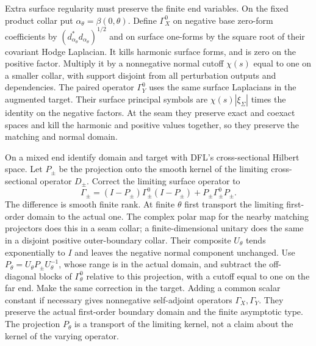 \documentclass[11pt]{amsart}
\theoremstyle{definition}
\theoremstyle{remark}
\theoremstyle{plain}
\begin{document}
Extra surface regularity must preserve the finite end variables.
On the fixed product collar put $\alpha_\theta=\beta(0,\theta)$.
Define $\Gamma_X^0$ on negative base zero-form coefficients by
$(d_{\alpha_\theta}^*d_{\alpha_\theta})^{1/2}$ and on surface
one-forms by the square root of their covariant Hodge Laplacian.
It kills harmonic surface forms, and is zero on the positive factor.
Multiply it by a nonnegative normal cutoff $\chi(s)$ equal to one
on a smaller collar, with support disjoint from all perturbation
outputs and dependencies. The paired operator $\Gamma_Y^0$ uses
the same surface Laplacians in the augmented target. Their surface
principal symbols are $\chi(s)|\xi_\Sigma|$ times the identity
on the negative factors. At the seam they preserve exact and coexact
spaces and kill the harmonic and positive values together, so they
preserve the matching and normal domain.

On a mixed end identify domain and target with DFL's cross-sectional
Hilbert space. Let $P_\pm$ be the projection onto the smooth kernel
of the limiting cross-sectional operator $D_\pm$. Correct the
limiting surface operator to
\begin{equation}\label{eq:residual-end-surface-correction}
 \Gamma_\pm=(I-P_\pm)\Gamma_\pm^0(I-P_\pm)
                              +P_\pm\Gamma_\pm^0P_\pm.
\end{equation}
The difference is smooth finite rank. At finite $\theta$ first
transport the limiting first-order domain to the actual one. The
complex polar map for the nearby matching projectors does this in a
seam collar; a finite-dimensional unitary does the same in a disjoint
positive outer-boundary collar. Their composite $U_\theta$ tends
exponentially to $I$ and leaves the negative normal component unchanged.
Use $P_\theta=U_\theta P_\pm U_\theta^{-1}$, whose range is in
the actual domain, and subtract the off-diagonal blocks of
$\Gamma^0_\theta$ relative to this projection, with a cutoff equal
to one on the far end. Make the same correction in the target.
Adding a common scalar constant if necessary gives nonnegative
self-adjoint operators $\Gamma_X,\Gamma_Y$. They preserve the
actual first-order boundary domain and the finite asymptotic type.
The projection $P_\theta$ is a transport of the limiting kernel,
not a claim about the kernel of the varying operator.
\end{document}
